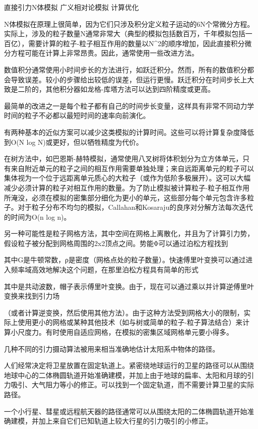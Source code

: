 直接引力N体模拟
广义相对论模拟
计算优化

N体模拟在原理上很简单，因为它们只涉及积分定义粒子运动的6N个常微分方程。实际上，涉及的粒子数量N通常非常大（典型的模拟包括数百万，千年模拟包括一百亿），需要计算的粒子-粒子相互作用的数量以N^2的顺序增加，因此直接积分微分方程可能在计算上非常昂贵。因此，通常使用一些改进方法。

数值积分通常使用小时间步长的方法进行，如跃迁积分。然而，所有的数值积分都会导致误差。较小的步骤给出较低的误差，但运行更慢。跃迁积分在时间步长上大致是二阶的，其他积分器如龙格-库塔方法可以达到四阶精度或更高。

最简单的改进之一是每个粒子都有自己的时间步长变量，这样具有非常不同动力学时间的粒子不必都以最短时间的速率向前演化。

有两种基本的近似方案可以减少这类模拟的计算时间。这些可以将计算复杂度降低到O(N log N)或更好，但以牺牲精度为代价。

在树方法中，如巴恩斯-赫特模拟，通常使用八叉树将体积划分为立方体单元，只有来自附近单元的粒子之间的相互作用需要单独处理；来自远距离单元的粒子可以集体视为一个位于远距离单元质心的大粒子（或作为低阶多极展开）。这可以大幅减少必须计算的粒子对相互作用的数量。为了防止模拟被计算粒子-粒子相互作用所淹没，必须在模拟的密集部分细化为更小的单元，这些部分每个单元包含许多粒子。对于粒子分布不均匀的模拟，Callahan和Kosaraju的良序对分解方法每次迭代的时间为O(n log n)。

另一种可能性是粒子网格方法，其中空间在网格上离散化，并且为了计算引力势，假设粒子被分配到网格周围的2x2顶点之间。势能Φ可以通过泊松方程找到

其中G是牛顿常数，ρ是密度（网格点处的粒子数量）。快速傅里叶变换可以通过进入频率域高效地解决这个问题，在那里泊松方程具有简单的形式

其中是共动波数，帽子表示傅里叶变换。由于，现在可以通过乘以并计算逆傅里叶变换来找到引力场

（或者计算逆变换，然后使用其他方法）。由于这种方法受到网格大小的限制，实际上使用更小的网格或某种其他技术（如与树或简单的粒子-粒子算法结合）来计算小尺度力。有时使用自适应网格，在模拟的密集区域网格单元要小得多。

几种不同的引力摄动算法被用来相当准确地估计太阳系中物体的路径。

人们经常决定将卫星放置在固定轨道上。紧密绕地球运行的卫星的路径可以从围绕地球中心的二体椭圆轨道开始准确建模，并加上由于地球的扁率、太阳和月球的引力吸引、大气阻力等小的修正。可以找到一个固定轨道，而不需要计算卫星的实际路径。

一个小行星、彗星或远程航天器的路径通常可以从围绕太阳的二体椭圆轨道开始准确建模，并加上来自它们已知轨道上较大行星的引力吸引的小修正。

